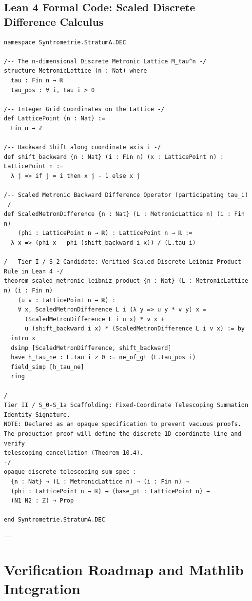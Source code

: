\documentclass[
    12pt,
    a4paper,
    headings=normal,
    twoside=true,
    BCOR=8mm,
]{scrbook}
\begin{document}
\subsection*{Lean 4 Formal Code: Scaled Discrete Difference Calculus}
\begin{verbatim}
namespace Syntrometrie.StratumA.DEC

/-- The n-dimensional Discrete Metronic Lattice M_tau^n -/
structure MetronicLattice (n : Nat) where
  tau : Fin n → ℝ
  tau_pos : ∀ i, tau i > 0

/-- Integer Grid Coordinates on the Lattice -/
def LatticePoint (n : Nat) :=
  Fin n → ℤ

/-- Backward Shift along coordinate axis i -/
def shift_backward {n : Nat} (i : Fin n) (x : LatticePoint n) : LatticePoint n :=
  λ j => if j = i then x j - 1 else x j

/-- Scaled Metronic Backward Difference Operator (participating tau_i) -/
def ScaledMetronDifference {n : Nat} (L : MetronicLattice n) (i : Fin n)
    (phi : LatticePoint n → ℝ) : LatticePoint n → ℝ :=
  λ x => (phi x - phi (shift_backward i x)) / (L.tau i)

/-- Tier I / S_2 Candidate: Verified Scaled Discrete Leibniz Product Rule in Lean 4 -/
theorem scaled_metronic_leibniz_product {n : Nat} (L : MetronicLattice n) (i : Fin n)
    (u v : LatticePoint n → ℝ) :
    ∀ x, ScaledMetronDifference L i (λ y => u y * v y) x =
      (ScaledMetronDifference L i u x) * v x +
      u (shift_backward i x) * (ScaledMetronDifference L i v x) := by
  intro x
  dsimp [ScaledMetronDifference, shift_backward]
  have h_tau_ne : L.tau i ≠ 0 := ne_of_gt (L.tau_pos i)
  field_simp [h_tau_ne]
  ring

/--
Tier II / S_0-S_1a Scaffolding: Fixed-Coordinate Telescoping Summation Identity Signature.
NOTE: Declared as an opaque specification to prevent vacuous proofs.
The production proof will define the discrete 1D coordinate line and verify
telescoping cancellation (Theorem 10.4).
-/
opaque discrete_telescoping_sum_spec :
  {n : Nat} → (L : MetronicLattice n) → (i : Fin n) →
  (phi : LatticePoint n → ℝ) → (base_pt : LatticePoint n) →
  (N1 N2 : ℤ) → Prop

end Syntrometrie.StratumA.DEC
\end{verbatim}

---

\section{Verification Roadmap and Mathlib Integration}
\label{sec:app_c_roadmap}
\end{document}
